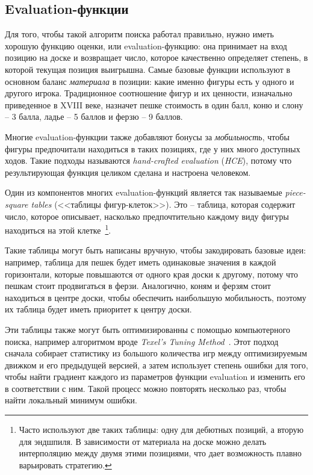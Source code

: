 \documentclass{article}
\begin{document}
\subsection{Evaluation-функции}

Для того, чтобы такой алгоритм поиска работал правильно,
нужно иметь хорошую функцию оценки, или evaluation-функцию:
она принимает на вход позицию на доске и возвращает число,
которое качественно определяет степень,
в которой текущая позиция выигрышна.
Самые базовые функции используют в основном баланс \emph{материала} в позиции:
какие именно фигуры есть у одного и другого игрока.
Традиционное соотношение фигур и их ценности,
изначально приведенное в XVIII веке,
назначет пешке стоимость в один балл,
коню и слону -- 3 балла,
ладье -- 5 баллов
и ферзю -- 9 баллов.

Многие evaluation-функции также добавляют бонусы за \emph{мобильность},
чтобы фигуры предпочитали находиться в таких позициях,
где у них много доступных ходов.
Такие подходы называются \emph{hand-crafted evaluation} (\emph{HCE}),
потому что результирующая функция целиком сделана и настроена человеком.

Один из компонентов многих evaluation-функций является
так называемые \emph{piece-square tables} (<<таблицы фигур-клеток>>).
Это -- таблица, которая содержит число, которое описывает,
насколько предпочтительно каждому виду фигуры находиться на этой клетке~\footnote{
    Часто используют две таких таблицы: одну для дебютных позиций,
    а вторую для эндшпиля.
    В зависимости от материала на доске
    можно делать интерполяцию между двумя этими позициями,
    что дает возможность плавно варьировать стратегию.
}.

Такие таблицы могут быть написаны вручную,
чтобы закодировать базовые идеи:
например, таблица для пешек будет иметь одинаковые значения в каждой горизонтали,
которые повышаются от одного края доски к другому,
потому что пешкам стоит продвигаться в ферзи.
Аналогично, коням и ферзям стоит находиться в центре доски,
чтобы обеспечить наибольшую мобильность,
поэтому их таблица будет иметь приоритет к центру доски.

Эти таблицы также могут быть оптимизированны с помощью компьютерного поиска,
например алгоритмом вроде \emph{Texel's Tuning Method}~\cite{texel-tuning}.
Этот подход сначала собирает статистику из большого количества игр
между оптимизируемым движком и его предыдущей версией,
а затем использует степень ошибки для того, чтобы найти градиент каждого из параметров функции evaluation
и изменить его в соответствии с ним.
Такой процесс можно повторять несколько раз,
чтобы найти локальный минимум ошибки.
\end{document}
